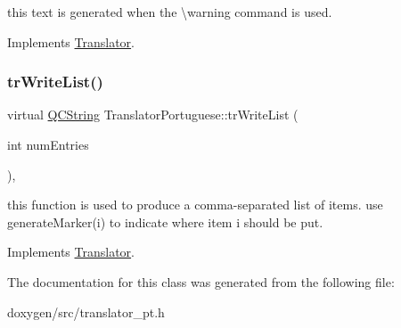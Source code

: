 this text is generated when the \textbackslash{}warning command is used. 

Implements \mbox{\hyperlink{class_translator}{Translator}}.

\mbox{\label{class_translator_portuguese_a771f788b30c419b14172504ca0299ce7}} 
\subsubsection{\texorpdfstring{trWriteList()}{trWriteList()}}
{\footnotesize\ttfamily virtual \mbox{\hyperlink{class_q_c_string}{Q\+C\+String}} Translator\+Portuguese\+::tr\+Write\+List (\begin{DoxyParamCaption}\item[{int}]{num\+Entries }\end{DoxyParamCaption})\hspace{0.3cm}{\ttfamily [inline]}, {\ttfamily [virtual]}}

this function is used to produce a comma-\/separated list of items. use generate\+Marker(i) to indicate where item i should be put. 

Implements \mbox{\hyperlink{class_translator}{Translator}}.



The documentation for this class was generated from the following file\+:\begin{DoxyCompactItemize}
\item 
doxygen/src/translator\+\_\+pt.\+h\end{DoxyCompactItemize}
